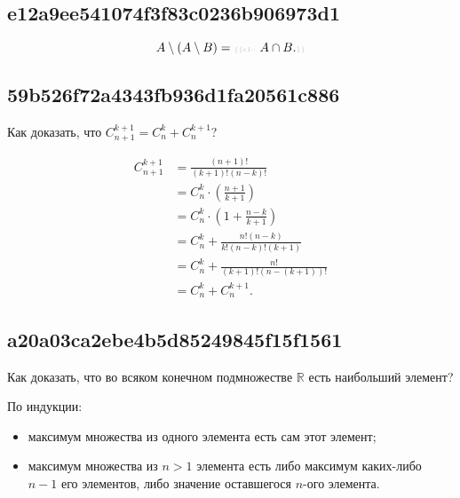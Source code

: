 \documentclass[11pt, a5paper]{article}
\newenvironment{note}[1]{\goodbreak\par\subsection{\hfill \color{lightgray}\tiny #1}}{}
\newenvironment{cloze}[2][\ldots]{\begin{leftbar}}{\end{leftbar}}
\newenvironment{icloze}[2][\ldots]{%
  \ignorespaces\text{\tiny \color{lightgray} \{\{c#2:: }%
}{%
  \text{\tiny \color{lightgray}\}\}}\unskip%
}
\begin{document}
    \begin{note}{e12a9ee541074f3f83c0236b906973d1}
        \[
            A \setminus (A \setminus B) = \begin{icloze}{1}A \cap B.\end{icloze}
        \]
    \end{note}

    \begin{note}{59b526f72a4343fb936d1fa20561c886}
        Как доказать, что \; \( C_{n + 1}^{k + 1} = C_n^k + C_n^{k + 1} \)?
        \begin{cloze}{1}
            \begin{align*}
                C_{n + 1}^{k + 1} &= \frac{(n + 1)!}{(k + 1)!(n - k)!} \\
                &= C_n^k \cdot \left( \frac{n + 1}{k + 1}  \right) \\
                &= C_n^k \cdot \left( 1 + \frac{n - k}{k + 1}  \right) \\
                &= C_n^k + \frac{n! (n - k)}{k!(n - k)!(k + 1)} \\
                &= C_n^k + \frac{n!}{(k + 1)!(n - (k + 1))!} \\
                &= C_n^k + C_n^{k + 1}.
            \end{align*}
        \end{cloze}
    \end{note}

    \begin{note}{a20a03ca2ebe4b5d85249845f15f1561}
        Как доказать, что во всяком конечном подмножестве \(\mathbb{R}\) есть
        наибольший элемент?

        \begin{cloze}{1}
            По индукции:
            \begin{itemize}
                \item максимум множества из одного элемента есть сам этот
                    элемент;
                \item максимум множества из \( n > 1 \) элемента есть либо
                    максимум каких-либо \( n - 1 \) его элементов, либо значение
                    оставшегося \( n \)-ого элемента.
            \end{itemize}
        \end{cloze}
    \end{note}
\end{document}
